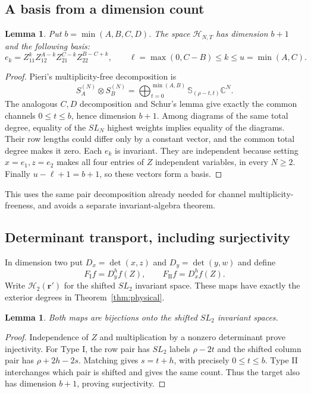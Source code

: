 \documentclass[10pt,a4paper]{article}
\newtheorem{lemma}[theorem]{Lemma}
\begin{document}
\subsection{A basis from a dimension count}
\begin{lemma}\label{lem:pairingbasis}
Put $b=\min(A,B,C,D)$. The space $\mathcal H_{N,T}$ has dimension $b+1$
and the following basis:
\begin{equation}\label{eq:monomial}
 e_k=Z_{11}^{k}Z_{12}^{A-k}Z_{21}^{C-k}Z_{22}^{B-C+k},
 \qquad \ell=\max(0,C-B)\le k\le u=\min(A,C).
\end{equation}
\end{lemma}
\begin{proof}
Pieri's multiplicity-free decomposition \cite[Sec.~6.1, Eq.~(6.8)]{FH} is
\begin{equation}\label{eq:pieri}
 S_A^{(N)}\otimes S_B^{(N)}
 =\bigoplus_{t=0}^{\min(A,B)}\mathbb S_{(\rho-t,t)}\mathbb C^N.
\end{equation}
The analogous $C,D$ decomposition and Schur's lemma give exactly the
common channels $0\le t\le b$, hence dimension $b+1$.
Among diagrams of the same total degree, equality of the $SL_N$ highest
weights implies equality of the diagrams. Their row lengths could differ
only by a constant vector, and the common total degree makes it zero. Each $e_k$
is invariant. They are independent because setting $x=e_1,z=e_2$ makes
all four entries of $Z$ independent variables, in every $N\ge2$.
Finally $u-\ell+1=b+1$, so these vectors form a basis.
\end{proof}
This uses the same pair decomposition already needed for channel
multiplicity-freeness, and avoids a separate invariant-algebra theorem.

\subsection{Determinant transport, including surjectivity}
In dimension two put $D_x=\det(x,z)$ and $D_y=\det(y,w)$ and define
\begin{equation}\label{eq:Fmap}
 F_{\mathrm I}f=D_y^h f(Z),\qquad F_{\mathrm {II}}f=D_x^h f(Z).
\end{equation}
Write $\mathcal H_2(\boldsymbol r')$ for the shifted $SL_2$ invariant
space. These maps have exactly the exterior degrees in
Theorem~\ref{thm:physical}.
\begin{lemma}\label{lem:bijection}
Both maps are bijections onto the shifted $SL_2$ invariant spaces.
\end{lemma}
\begin{proof}
Independence of $Z$ and multiplication by a nonzero determinant prove
injectivity. For Type I, the row pair has $SL_2$ labels $\rho-2t$ and
the shifted column pair has $\rho+2h-2s$. Matching gives $s=t+h$,
with precisely $0\le t\le b$. Type II interchanges which pair is
shifted and gives the same count. Thus the target also has dimension
$b+1$, proving surjectivity.
\end{proof}
\end{document}

